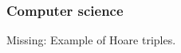\subsubsection{Computer science}

\begin{publictodo}
    Missing: Example of Hoare triples.
\end{publictodo}

